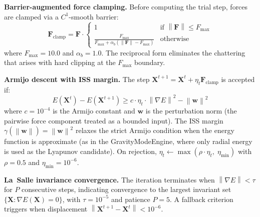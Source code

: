 \documentclass{article}
\newcommand{\norm}[1]{\left\lVert#1\right\rVert}
\begin{document}
\textbf{Barrier-augmented force clamping.} Before computing the trial step, forces are clamped via a $C^1$-smooth barrier:
\begin{equation}
\mathbf{F}_{\text{clamp}} = \mathbf{F} \cdot \begin{cases}
1 & \text{if } \norm{\mathbf{F}} \leq F_{\max} \\
\displaystyle\frac{F_{\max}}{F_{\max} + \alpha_b(\norm{\mathbf{F}} - F_{\max})} & \text{otherwise}
\end{cases}
\label{eq:barrier}
\end{equation}
where $F_{\max} = 10.0$ and $\alpha_b = 1.0$. The reciprocal form eliminates the chattering that arises with hard clipping at the $F_{\max}$ boundary.

\textbf{Armijo descent with ISS margin.} The step $\mathbf{X}^{t+1} = \mathbf{X}^t + \eta_t \mathbf{F}_{\text{clamp}}$ is accepted if:
\begin{equation}
E(\mathbf{X}^t) - E(\mathbf{X}^{t+1}) \geq c \cdot \eta_t \cdot \norm{\nabla E}^2 - \norm{\mathbf{w}}^2
\label{eq:armijo_iss}
\end{equation}
where $c = 10^{-4}$ is the Armijo constant and $\mathbf{w}$ is the perturbation norm (the pairwise force component treated as a bounded input). The ISS margin $\gamma(\norm{\mathbf{w}}) = \norm{\mathbf{w}}^2$ relaxes the strict Armijo condition when the energy function is approximate (as in the GravityModeEngine, where only radial energy is used as the Lyapunov candidate). On rejection, $\eta_t \leftarrow \max(\rho \cdot \eta_t,\; \eta_{\min})$ with $\rho = 0.5$ and $\eta_{\min} = 10^{-6}$.

\textbf{La~Salle invariance convergence.} The iteration terminates when $\norm{\nabla E} < \tau$ for $P$ consecutive steps, indicating convergence to the largest invariant set $\{\mathbf{X} : \nabla E(\mathbf{X}) = 0\}$, with $\tau = 10^{-5}$ and patience $P = 5$. A fallback criterion triggers when displacement $\norm{\mathbf{X}^{t+1} - \mathbf{X}^t} < 10^{-6}$.
\end{document}
